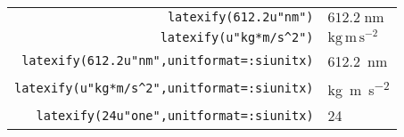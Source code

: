 \documentclass{standalone}
\begin{document}
\begin{tabular}{rl}
        \verb+latexify(612.2u"nm")+ & $612.2\;\mathrm{nm}$\\
        \verb+latexify(u"kg*m/s^2")+ & $\mathrm{kg}\,\mathrm{m}\,\mathrm{s}^{-2}$\\
        \verb+latexify(612.2u"nm",unitformat=:siunitx)+ & \SI{612.2}{\nano\meter}\\
        \verb+latexify(u"kg*m/s^2",unitformat=:siunitx)+ & \si{\kilo\gram\meter\per\second\tothe{2}}\\
        \verb+latexify(24u"one",unitformat=:siunitx)+ & \num{24}\\
\end{tabular}
\end{document}
